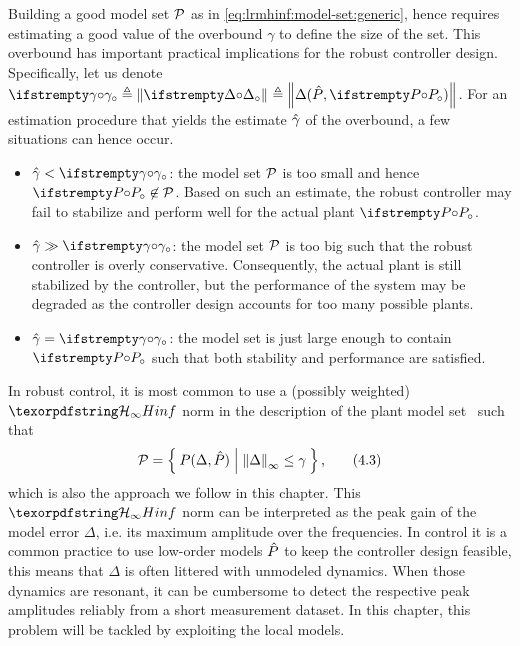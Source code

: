 \documentclass{responseletter}
\begin{document}
\begin{enumerate}
\begin{newquote}
Building a good model set $\ModelSet[]$ as in \eqref{eq:lrmhinf:model-set:generic}, hence requires estimating a good value of the overbound $\gamma$ to define the size of the set.
This overbound has important practical implications for the robust controller design.
Specifically, let us denote $\true{\gamma} \isdef \norm{\true\Delta} \isdef \norm{\Delta(\estimated{\Plant}, \true{\Plant})}$.
For an estimation procedure that yields the estimate $\estimated{\gamma}$ of the overbound, a few situations can hence occur.
\begin{itemize}
  \item $\estimated\gamma < \true{\gamma}$: the model set $\ModelSet[]$ is too small and hence $\true{\Plant} \not\in \ModelSet[]$.
  Based on such an estimate, the robust controller may fail to stabilize and perform well for the actual plant $\true{\Plant}$.
  \item $\estimated\gamma \gg \true{\gamma}$: the model set $\ModelSet[]$ is too big such that the robust controller is overly conservative.
  Consequently, the actual plant is still stabilized by the controller, but the performance of the system may be degraded as the controller design accounts for too many possible plants.
    \item $\estimated\gamma = \true{\gamma}$: the model set is just large enough to contain $\true{\Plant}$ such that both stability and performance are satisfied.
\end{itemize}

In robust control, it is most common to use a (possibly weighted) $\Hinf{}$ norm in the description of the plant model set~\citep{Skogestad2005,Zhou1996} such that
\begin{equation}
\ModelSet[] = \Set{ \Plant(\Delta, \estimated{\Plant}) | \norm[\infty]{\Delta 
} \leq \gamma}
  \text{,}
  \label{eq:lrmhinf:model-set:hinf}
  \tag{4.3}
\end{equation}
which is also the approach we follow in this chapter.
This $\Hinf{}$ norm can be interpreted as the peak gain of the model error $\Delta$, i.e. its maximum amplitude over the frequencies.
In control it is a common practice to use low-order models $\estimated{\Plant}$ to keep the controller design feasible, this means that $\Delta$ is often littered with unmodeled dynamics.
When those dynamics are resonant, it can be cumbersome to detect the respective peak amplitudes reliably from a short measurement dataset.
In this chapter, this problem will be tackled by exploiting the local models.
  \end{newquote}


\end{enumerate}
\end{document}
